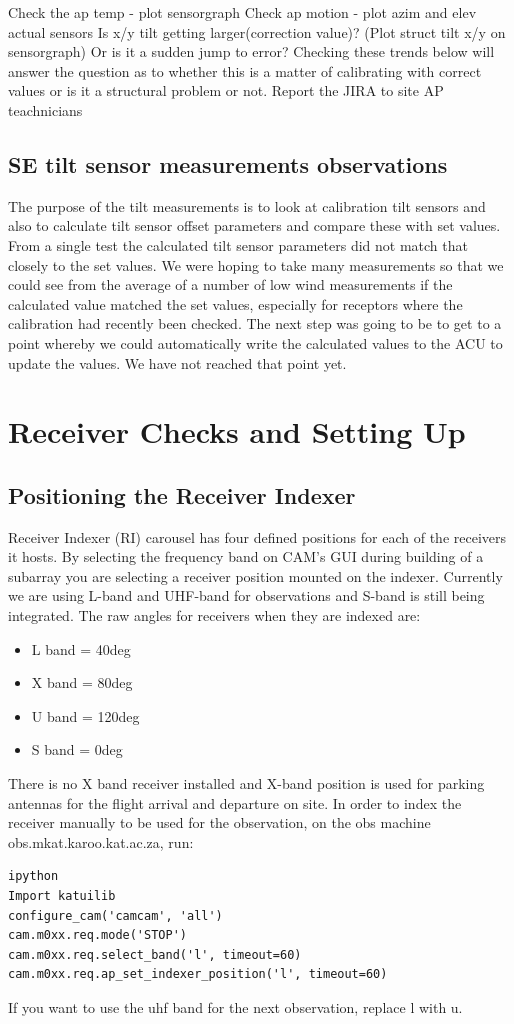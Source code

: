 Check the  ap temp - plot sensorgraph
Check ap motion - plot azim and elev actual sensors
Is x/y tilt getting larger(correction value)? (Plot struct tilt x/y on sensorgraph)
Or is it a sudden jump to error? 
Checking these trends below will answer the question as to whether this is a matter of calibrating with correct values or is it a structural problem or not.
Report the JIRA to site AP teachnicians
\subsection{ SE tilt sensor measurements observations }
The purpose of the tilt measurements is to look at calibration tilt sensors and also to calculate tilt sensor offset parameters and compare these with set values. From a single test the calculated tilt sensor parameters did not match that closely to the set values. We were hoping to take many measurements so that we could see from the average of a number of low wind measurements if the calculated value matched the set values, especially for receptors where the calibration had recently been checked.   The next step was going to be to get to a point whereby we could automatically write the calculated values to the ACU to update the values. We have not reached that point yet.

\section{Receiver Checks and Setting Up }

\subsection{Positioning the Receiver Indexer}
Receiver Indexer (RI) carousel has four defined positions for each of the receivers it hosts. By selecting the frequency band on CAM’s  GUI during building of a subarray you are selecting a receiver position mounted on the indexer. Currently we are using L-band and UHF-band for observations and S-band is still being integrated. The raw angles for receivers when they are indexed are:
\begin{itemize}
	\item{} L band = 40deg
	\item{} X band = 80deg
	\item{} U band = 120deg
	\item{} S band = 0deg
\end{itemize}
There is no X band receiver installed and X-band position is used for parking antennas for the flight arrival and departure on site. 
In order to index the receiver manually to be used for the observation, on the obs machine obs.mkat.karoo.kat.ac.za,  run:	
\begin{lstlisting}[style=DOS]
ipython
Import katuilib
configure_cam('camcam', 'all')
cam.m0xx.req.mode('STOP') 
cam.m0xx.req.select_band('l', timeout=60)   
cam.m0xx.req.ap_set_indexer_position('l', timeout=60)
\end{lstlisting}
If you want to use the uhf band for the next observation, replace l with u.  

